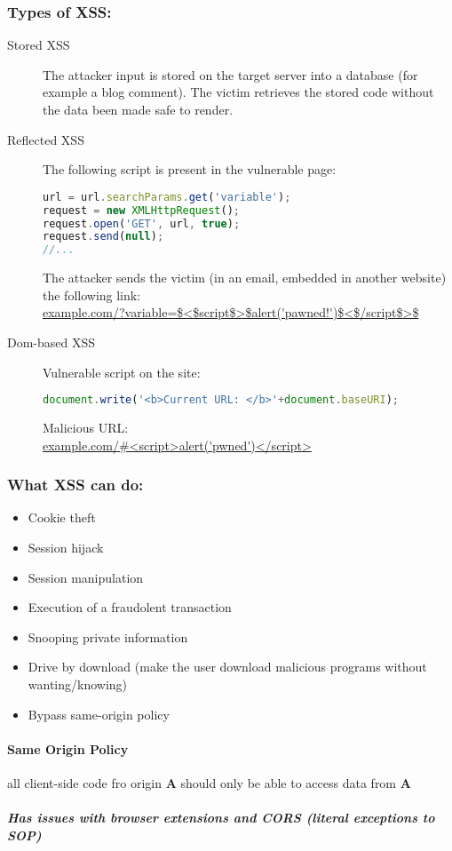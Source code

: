 \documentclass{article}
\begin{document}
\subsubsection{Types of XSS:}
\begin{description}
\item[Stored XSS] The attacker input is stored on the target server into a database (for example a blog comment). The victim retrieves the stored code without the data been made safe to render.
\item[Reflected XSS] 
The following script is present in the vulnerable page:
\begin{lstlisting}[language=JavaScript]
url = url.searchParams.get('variable');
request = new XMLHttpRequest();
request.open('GET', url, true);
request.send(null);
//...
\end{lstlisting}
The attacker sends the victim (in an email, embedded in another website) the following link:\\
\url{example.com/?variable=$<$script$>$alert('pawned!')$<$/script$>$}
\item[Dom-based XSS] Vulnerable script on the site:
\begin{lstlisting}[language=JavaScript]
document.write('<b>Current URL: </b>'+document.baseURI);
\end{lstlisting}
Malicious URL:\\
\url{example.com/#<script>alert('pwned')</script>}
\end{description}
\subsubsection{What XSS can do:}
\begin{itemize}
\item Cookie theft
\item Session hijack
\item Session manipulation
\item Execution of a fraudolent transaction
\item Snooping private information
\item Drive by download (make the user download malicious programs without wanting/knowing)
\item Bypass same-origin policy
\end{itemize}
\paragraph{Same Origin Policy} all client-side code fro origin \textbf{A} should only be able to access data from \textbf{A}
\subparagraph{Has issues with browser extensions and CORS (literal exceptions to SOP)}
\end{document}
